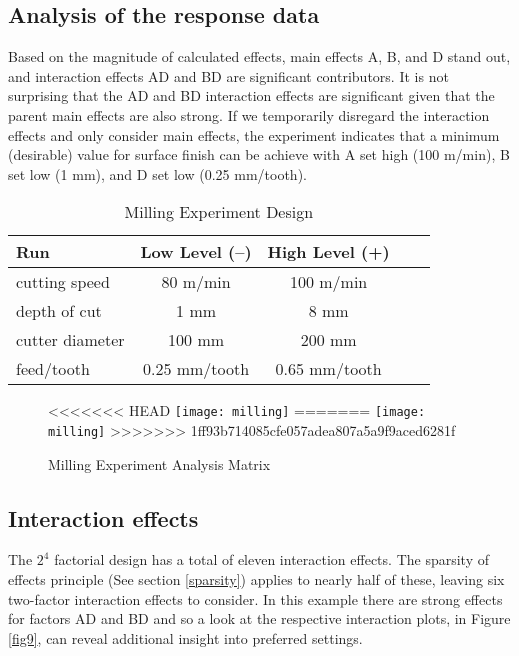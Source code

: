\subsection{Analysis of the response data}
Based on the magnitude of calculated effects, main effects A, B, and D stand out, and interaction effects AD and BD are significant contributors.  It is not surprising that the AD and BD interaction effects are significant given that the parent main effects are also strong. If we temporarily disregard the interaction effects and only consider main effects, the experiment indicates that a minimum (desirable) value for surface finish can be achieve with A set high (100 m/min), B set low (1 mm), and D set low (0.25 mm/tooth).\label{maineff}

\begin{table}[h]\caption{Milling Experiment Design}\label{tab8}
\begin{center}
\begin{tabular}{|l|c|c|c|c|}
\hline Run & Low Level (--) & High Level (+)  \\ 
\hline cutting speed & 80 m/min & 100 m/min  \\
\hline depth of cut & 1 mm & 8 mm \\
\hline cutter diameter & 100 mm & 200 mm\\
\hline feed/tooth & 0.25 mm/tooth & 0.65 mm/tooth \\
\hline
\end{tabular} 
\end{center}
\end{table}

\begin{sidewaysfigure}[h]\caption{Milling Experiment Analysis Matrix}\label{fig8}
\begin{center}
<<<<<<< HEAD
\texttt{[image: milling]}
=======
\texttt{[image: milling]}
>>>>>>> 1ff93b714085cfe057adea807a5a9f9aced6281f
\end{center}
\end{sidewaysfigure}

\subsection{Interaction effects}
The $2^{4}$ factorial design has a total of eleven interaction effects.  The sparsity of effects principle (See section \ref{sparsity}) applies to nearly half of these, leaving six two-factor interaction effects to consider.  In this example there are strong effects for factors AD and BD and so a look at the respective interaction plots, in Figure \ref{fig9}, can reveal additional insight into preferred settings.

